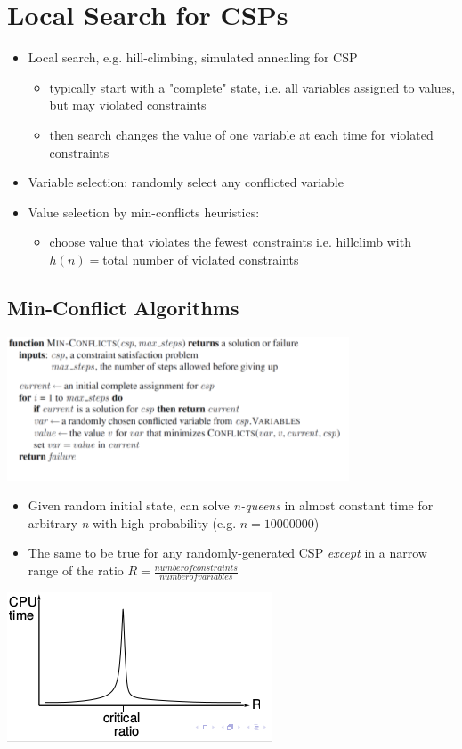 \section{Local Search for CSPs}
\begin{itemize}
\item Local search, e.g. hill-climbing, simulated annealing for CSP
\begin{itemize}
\item typically start with a "complete" state, i.e. all variables assigned to values, but may violated constraints
\item then search changes the value of one variable at each time for violated constraints
\end{itemize}
\item Variable selection: randomly select any conflicted variable
\item Value selection by min-conflicts heuristics:
\begin{itemize}
\item choose value that violates the fewest constraints i.e. hillclimb with $h(n) = $total number of violated constraints
\end{itemize}
\end{itemize}

\subsection{Min-Conflict Algorithms}
\includegraphics[scale=1]{chap1_pics/minconflictalgoithm.png} 

\begin{itemize}
\item Given random initial state, can solve \textit{n-queens} in almost constant time for arbitrary \textit{n} with high probability (e.g. $n = 10 000 000$)
\item The same to be true for any randomly-generated CSP \textit{except} in a narrow range of the ratio $R=\frac{number of constraints}{number of variables}$
\end{itemize}
\includegraphics[scale=1]{chap1_pics/minconfliggraph.png} 
